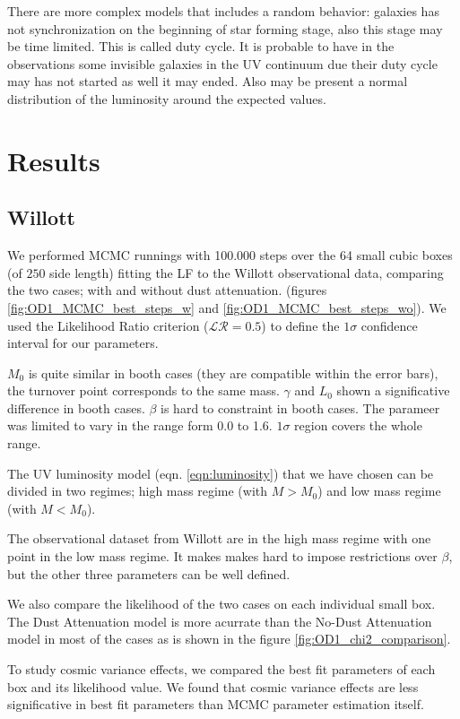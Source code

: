 \documentclass{emulateapj}
\newcommand{\hMpc}{{\ifmmode{h^{-1}{\rm Mpc}}\else{$h^{-1}$Mpc }\fi}}
\begin{document}
There are more complex models\citep{lee09} that includes a random behavior:
galaxies has not synchronization on the beginning of star forming stage, also
this stage may be time limited. This is called duty cycle. It is probable to
have in the observations some invisible galaxies in the UV continuum due their
duty cycle may has not started as well it may ended. Also may be present a
normal distribution of the luminosity around the expected values.

\section{Results}
\label{sec:results}

\subsection{Willott}

We performed MCMC runnings with 100.000 steps over the 64 small 
cubic boxes (of $250$ \hMpc side length) fitting the LF to the 
Willott observational data, comparing the two cases; with and 
without dust attenuation. (figures \ref{fig:OD1_MCMC_best_steps_w} and 
\ref{fig:OD1_MCMC_best_steps_wo}). 
We used the Likelihood Ratio criterion ($\mathcal{LR}= 0.5$) to
define the $1\sigma$ confidence interval for our parameters.

$M_0$ is quite similar in booth cases (they are compatible within 
the error bars), the turnover point corresponds to the same mass.
$\gamma$ and $L_0$ shown a significative difference in booth cases.
$\beta$ is hard to constraint in booth cases. 
The parameer was limited to vary in the range form 0.0 to 1.6. 
$1\sigma$ region covers the whole range.

The UV luminosity model (eqn. \ref{eqn:luminosity}) that we have 
chosen can be divided in two regimes; high mass regime 
(with $M > M_0$) and low mass regime (with $M < M_0$).

The observational dataset from Willott are in the high mass regime 
with one point in the low mass regime. It makes makes hard to impose
restrictions over $\beta$, but the other three parameters can be
well defined.

We also compare the likelihood of the two cases on each individual 
small box. The Dust Attenuation model is more acurrate than the
No-Dust Attenuation model in most of the cases as is shown in the figure 
\ref{fig:OD1_chi2_comparison}.

To study cosmic variance effects, we compared the best fit parameters
of each box and its likelihood value. We found that cosmic variance
effects are less significative in best fit parameters than MCMC parameter
estimation itself. 
\end{document}

